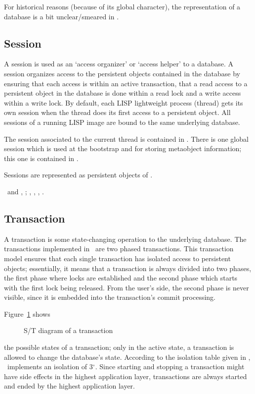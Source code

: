 For historical reasons (because of its global character), the
representation of a database is a bit unclear/smeared in \plobwoexcl.
     
\subsection{Session}%
\label{sec:SessionManagement}

A session is used as an `access organizer' or `access helper' to a
database. A session organizes access to the persistent objects
contained in the database by ensuring that each access is within an
active transaction, that a read access to a persistent object in the
database is done within a read lock and a write access within a write
lock. By default, each LISP lightweight process (thread) gets its own
session when the thread does its first access to a persistent
object. All sessions of a running LISP image are bound to the same
underlying database.

The session associated to the current thread is contained in
. There is one global session which
is used at the bootstrap and for storing metaobject information; this
one is contained in .

Sessions are represented as persistent objects of
.

 {}\ and ,
; ,
, , .

\subsection{Transaction}%
\label{sec:Transaction}

A transaction is some state-changing operation to the underlying
database. The transactions implemented in \plob\ are two phased
transactions. This transaction model ensures that each single
transaction has isolated access to persistent objects; essentially, it
means that a transaction is always divided into two phases, the first
phase where locks are established and the second phase which starts
with the first lock being released. From the user's side, the second
phase is never visible, since it is embedded into the transaction's
commit processing.

Figure~\ref{fig:TransactionSTDiagram} shows
\begin{figure}[htbp]
\centerline{}
\caption{S/T diagram of a transaction}%
\label{fig:TransactionSTDiagram}
\end{figure}%
the possible states of a transaction; only in the active state, a
transaction is allowed to change the database's state.  According to
the isolation table given in \cite[]{bib:Gray-et-al-93},
\plob\ implements an isolation of 3$^{\circ}$. Since starting and
stopping a transaction might have side effects in the highest
application layer, transactions are always started and ended by the
highest application layer.

